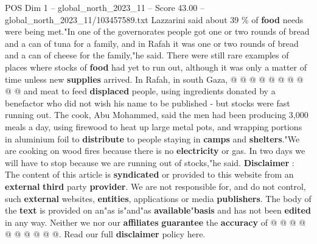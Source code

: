 \begin{textsample}{POS Dim 1 – global\_north\_2023\_11 – Score 43.00 – global\_north\_2023\_11/103457589.txt}
Lazzarini said about 39 \% of \textbf{food} needs were being met."In one of the governorates people got one or two rounds of bread and a can of tuna for a family, and in Rafah it was one or two rounds of bread and a can of cheese for the family,"he said.
There were still rare examples of places where stocks of \textbf{food} had yet to run out, although it was only a matter of time unless new \textbf{supplies} arrived.
In Rafah, in south Gaza, @ @ @ @ @ @ @ @ @ @ and meat to feed \textbf{displaced} people, using ingredients donated by a benefactor who did not wish his name to be published - but stocks were fast running out.
The cook, Abu Mohammed, said the men had been producing 3,000 meals a day, using firewood to heat up large metal pots, and wrapping portions in aluminium foil to \textbf{distribute} to people staying in \textbf{camps} and \textbf{shelters}."We are cooking on wood fires because there is no \textbf{electricity} or gas.
In two days we will have to stop because we are running out of stocks,"he said. \textbf{Disclaimer} : The content of this article is \textbf{syndicated} or provided to this website from an \textbf{external} \textbf{third} party \textbf{provider}.
We are not responsible for, and do not control, such \textbf{external} websites, \textbf{entities}, applications or media \textbf{publishers}.
The body of the \textbf{text} is provided on an"as is"and"as \textbf{available}"\textbf{basis} and has not been \textbf{edited} in any way.
Neither we nor our \textbf{affiliates} \textbf{guarantee} the \textbf{accuracy} of @ @ @ @ @ @ @ @ @ @.
Read our full \textbf{disclaimer} policy here.

\end{textsample}
